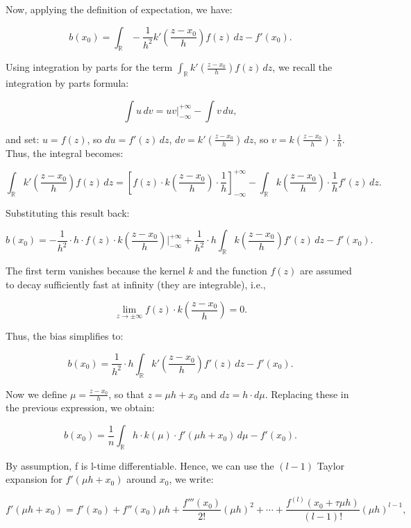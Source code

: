 \documentclass{article}
\begin{document}
Now, applying the definition of expectation, we have:

\[
b(x_0) = \int_{\mathbb{R}} -\frac{1}{h^2} k'\left(\frac{z - x_0}{h}\right) f(z) \, dz - f'(x_0).
\]

Using integration by parts for the term \(\int_{\mathbb{R}} k'\left(\frac{z - x_0}{h}\right) f(z) \, dz\), we recall the integration by parts formula:

\[
\int u \, dv = uv \Big|_{-\infty}^{+\infty} - \int v \, du,
\]

and set: \( u = f(z) \), so \( du = f'(z) \, dz \), \( dv = k'\left(\frac{z - x_0}{h}\right) \, dz \), so \( v = k\left(\frac{z - x_0}{h}\right) \cdot \frac{1}{h} \). \\

Thus, the integral becomes:

\[
\int_{\mathbb{R}} k'\left(\frac{z - x_0}{h}\right) f(z) \, dz = \left[f(z) \cdot k\left(\frac{z - x_0}{h}\right) \cdot \frac{1}{h}\right]_{-\infty}^{+\infty} - \int_{\mathbb{R}} k\left(\frac{z - x_0}{h}\right) \cdot \frac{1}{h} f'(z) \, dz.
\]

Substituting this result back:

\[
b(x_0) = -\frac{1}{h^2} \cdot h \cdot f(z) \cdot k\left(\frac{z - x_0}{h}\right) \Big|_{-\infty}^{+\infty} + \frac{1}{h^2} \cdot h \int_{\mathbb{R}} k\left(\frac{z - x_0}{h}\right) f'(z) \, dz - f'(x_0).
\]

The first term vanishes because the kernel \( k \) and the function \( f(z) \) are assumed to decay sufficiently fast at infinity (they are integrable), i.e.,

\[
\lim_{z \to \pm\infty} f(z) \cdot k\left(\frac{z - x_0}{h}\right) = 0.
\]

Thus, the bias simplifies to:

\[
b(x_0) = \frac{1}{h^2} \cdot h \int_{\mathbb{R}} k'\left(\frac{z - x_0}{h}\right) f'(z) \, dz - f'(x_0).
\]

Now we define \(\mu = \frac{z - x_0}{h}\), so that \(z = \mu h + x_0\) and \(dz = h \cdot d\mu\). Replacing these in the previous expression, we obtain:

\[
b(x_0) = \frac{1}{n} \int_{\mathbb{R}} h \cdot k(\mu) \cdot f'(\mu h + x_0) \, d\mu - f'(x_0).
\]

By assumption, f is l-time differentiable. Hence, we can use the $(l-1)$ Taylor expansion for \(f'(\mu h + x_0)\) around \(x_0\), we write:

\[
f'(\mu h + x_0) = f'(x_0) + f''(x_0) \mu h + \frac{f'''(x_0)}{2!} (\mu h)^2 + \cdots + \frac{f^{(l)}(x_0 + \tau \mu h)}{(l-1)!} (\mu h)^{l-1},
\]
\end{document}
